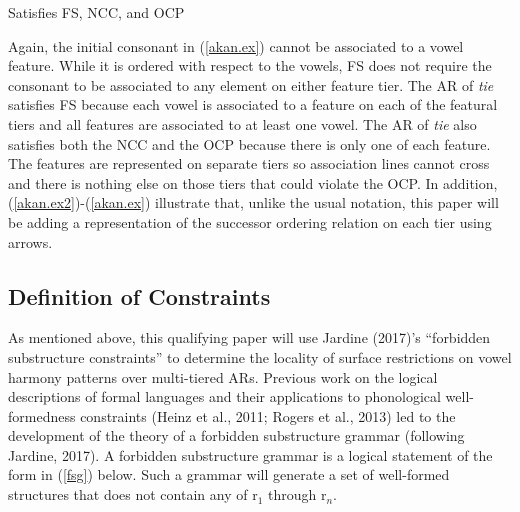 \documentclass[,doc,floatsintext]{apa6}
\theoremstyle{definition}
\theoremstyle{definition}
\theoremstyle{definition}
\theoremstyle{remark}
\begin{document}
\begin{exe}
\ex \label{akan.ex} Satisfies FS, NCC, and OCP \\
\end{exe}

Again, the initial consonant in (\ref{akan.ex}) cannot be associated to
a vowel feature. While it is ordered with respect to the vowels, FS does
not require the consonant to be associated to any element on either
feature tier. The AR of \emph{tie} satisfies FS because each vowel is
associated to a feature on each of the featural tiers and all features
are associated to at least one vowel. The AR of \emph{tie} also
satisfies both the NCC and the OCP because there is only one of each
feature. The features are represented on separate tiers so association
lines cannot cross and there is nothing else on those tiers that could
violate the OCP. In addition, (\ref{akan.ex2})-(\ref{akan.ex})
illustrate that, unlike the usual notation, this paper will be adding a
representation of the successor ordering relation on each tier using
arrows.

\subsection{Definition of Constraints}\label{definition-of-constraints}

As mentioned above, this qualifying paper will use Jardine (2017)'s
\enquote{forbidden substructure constraints} to determine the locality
of surface restrictions on vowel harmony patterns over multi-tiered ARs.
Previous work on the logical descriptions of formal languages and their
applications to phonological well-formedness constraints (Heinz et al.,
2011; Rogers et al., 2013) led to the development of the theory of a
forbidden substructure grammar (following Jardine, 2017). A forbidden
substructure grammar is a logical statement of the form in (\ref{fsg})
below. Such a grammar will generate a set of well-formed structures that
does not contain any of r\(_1\) through r\(_n\).
\end{document}
